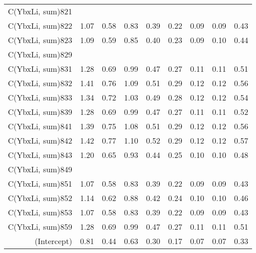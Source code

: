 \begin{table}[p]
\begin{tabular}{rrrrrrrrr}
  C(YbxLi, sum)821 &  &  &  &  &  &  &  &  \\ 
  C(YbxLi, sum)822 & 1.07 & 0.58 & 0.83 & 0.39 & 0.22 & 0.09 & 0.09 & 0.43 \\ 
  C(YbxLi, sum)823 & 1.09 & 0.59 & 0.85 & 0.40 & 0.23 & 0.09 & 0.10 & 0.44 \\ 
  C(YbxLi, sum)829 &  &  &  &  &  &  &  &  \\ 
  C(YbxLi, sum)831 & 1.28 & 0.69 & 0.99 & 0.47 & 0.27 & 0.11 & 0.11 & 0.51 \\ 
  C(YbxLi, sum)832 & 1.41 & 0.76 & 1.09 & 0.51 & 0.29 & 0.12 & 0.12 & 0.56 \\ 
  C(YbxLi, sum)833 & 1.34 & 0.72 & 1.03 & 0.49 & 0.28 & 0.12 & 0.12 & 0.54 \\ 
  C(YbxLi, sum)839 & 1.28 & 0.69 & 0.99 & 0.47 & 0.27 & 0.11 & 0.11 & 0.52 \\ 
  C(YbxLi, sum)841 & 1.39 & 0.75 & 1.08 & 0.51 & 0.29 & 0.12 & 0.12 & 0.56 \\ 
  C(YbxLi, sum)842 & 1.42 & 0.77 & 1.10 & 0.52 & 0.29 & 0.12 & 0.12 & 0.57 \\ 
  C(YbxLi, sum)843 & 1.20 & 0.65 & 0.93 & 0.44 & 0.25 & 0.10 & 0.10 & 0.48 \\ 
  C(YbxLi, sum)849 &  &  &  &  &  &  &  &  \\ 
  C(YbxLi, sum)851 & 1.07 & 0.58 & 0.83 & 0.39 & 0.22 & 0.09 & 0.09 & 0.43 \\ 
  C(YbxLi, sum)852 & 1.14 & 0.62 & 0.88 & 0.42 & 0.24 & 0.10 & 0.10 & 0.46 \\ 
  C(YbxLi, sum)853 & 1.07 & 0.58 & 0.83 & 0.39 & 0.22 & 0.09 & 0.09 & 0.43 \\ 
  C(YbxLi, sum)859 & 1.28 & 0.69 & 0.99 & 0.47 & 0.27 & 0.11 & 0.11 & 0.51 \\ 
  (Intercept) & 0.81 & 0.44 & 0.63 & 0.30 & 0.17 & 0.07 & 0.07 & 0.33 \\ 
   \hline
\end{tabular}
\end{table}
